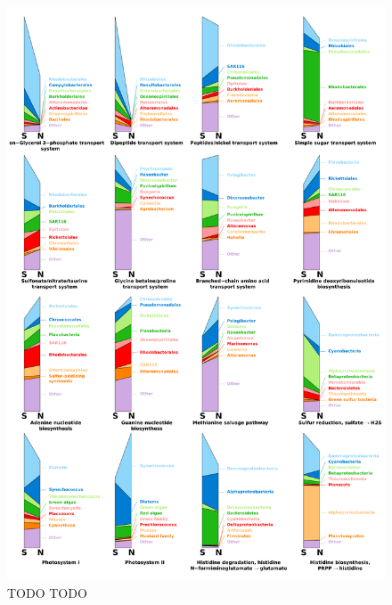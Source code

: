 \begin{figure}
  \centering
  \includegraphics[width=\textwidth]{../polarfront/moduledecomp.png}
  \caption[TODO TODO ]{TODO TODO}
  \label{fig:moduledecomp}
\end{figure}
